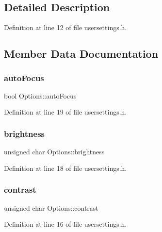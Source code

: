 \subsection{Detailed Description}


Definition at line 12 of file usersettings.\+h.



\subsection{Member Data Documentation}
\mbox{\label{struct_options_aab21de2c0338e19de5bf8f6f2c1e5fb6}} 
\subsubsection{\texorpdfstring{autoFocus}{autoFocus}}
{\footnotesize\ttfamily bool Options\+::auto\+Focus}



Definition at line 19 of file usersettings.\+h.

\mbox{\label{struct_options_add944f0eb9d34b2beb6ffe7a8c7797f7}} 
\subsubsection{\texorpdfstring{brightness}{brightness}}
{\footnotesize\ttfamily unsigned char Options\+::brightness}



Definition at line 18 of file usersettings.\+h.

\mbox{\label{struct_options_a983362fb0677019296772367eb16dca1}} 
\subsubsection{\texorpdfstring{contrast}{contrast}}
{\footnotesize\ttfamily unsigned char Options\+::contrast}



Definition at line 16 of file usersettings.\+h.

\mbox{\label{struct_options_a444d9527822f32e094907b1a8aa88d35}} 
